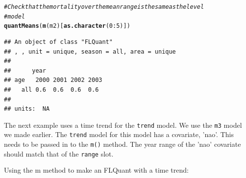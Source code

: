 \documentclass[a4paper,english,10pt]{article}\usepackage[]{graphicx}\usepackage[]{color}
\makeatletter
\newcommand{\hlnum}[1]{\textcolor[rgb]{0.686,0.059,0.569}{#1}}%
\newcommand{\hlcom}[1]{\textcolor[rgb]{0.678,0.584,0.686}{\textit{#1}}}%
\newcommand{\hlopt}[1]{\textcolor[rgb]{0,0,0}{#1}}%
\newcommand{\hlstd}[1]{\textcolor[rgb]{0.345,0.345,0.345}{#1}}%
\newcommand{\hlkwd}[1]{\textcolor[rgb]{0.737,0.353,0.396}{\textbf{#1}}}%
\newenvironment{kframe}{%
 \def\at@end@of@kframe{}%
 \ifinner\ifhmode%
  \def\at@end@of@kframe{\end{minipage}}%
  \begin{minipage}{\columnwidth}%
 \fi\fi%
 \def\FrameCommand##1{\hskip\@totalleftmargin \hskip-\fboxsep
 \colorbox{shadecolor}{##1}\hskip-\fboxsep
     \hskip-\linewidth \hskip-\@totalleftmargin \hskip\columnwidth}%
 \MakeFramed {\advance\hsize-\width
   \@totalleftmargin\z@ \linewidth\hsize
   \@setminipage}}%
 {\par\unskip\endMakeFramed%
 \at@end@of@kframe}
\newenvironment{knitrout}{}{} %
\newcommand{\code}[1]{{\texttt{#1}}}
\makeatother
\begin{document}
\begin{knitrout}
\begin{kframe}
\begin{alltt}
\hlcom{# Check that the mortality over the mean range is the same as the level}
\hlcom{# model}
\hlkwd{quantMeans}\hlstd{(}\hlkwd{m}\hlstd{(m2)[}\hlkwd{as.character}\hlstd{(}\hlnum{0}\hlopt{:}\hlnum{5}\hlstd{)])}
\end{alltt}
\begin{verbatim}
## An object of class "FLQuant"
## , , unit = unique, season = all, area = unique
## 
##      year
## age   2000 2001 2002 2003
##   all 0.6  0.6  0.6  0.6 
## 
## units:  NA
\end{verbatim}
\end{kframe}
\end{knitrout}


The next example uses a time trend for the \code{trend} model. We use the \code{m3} model we made earlier. The \code{trend} model for this model has a covariate, 'nao'. This needs to be passed in to the \code{m()} method. The year range of the 'nao' covariate should match that of the \code{range} slot.

Using the m method to make an FLQuant with a time trend:
\end{document}
